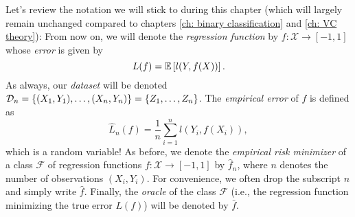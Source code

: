 Let's review the notation we will stick to during this chapter (which will largely remain unchanged compared to chapters \ref{ch: binary classification} and \ref{ch: VC theory}): From now on, we will denote the \emph{regression function} by $f \colon \mathcal{X} \to [-1, 1]$ whose \emph{error} is given by
\[
    L(f) = \mathbb{E}\left[l(Y, f(X))\right].
\]
As always, our \emph{dataset} will be denoted $\mathcal{D}_n = \left\{(X_1, Y_1), \dots, (X_n, Y_n)\right\} = \left\{Z_1, \dots, Z_n\right\}$. The \emph{empirical error} of $f$ is defined as
\[
    \hat L_n(f) = \frac{1}{n} \sum_{i=1}^n l(Y_i, f(X_i)),
\]
which is a random variable! As before, we denote the \emph{empirical risk minimizer} of a class $\mathcal{F}$ of regression functions $f \colon \mathcal{X} \to [-1, 1]$ by $\hat f_n$, where $n$ denotes the number of observations $(X_i, Y_i)$. For convenience, we often drop the subscript $n$ and simply write $\hat f$. Finally, the \emph{oracle} of the class $\mathcal{F}$ (i.e., the regression function minimizing the true error $L(f)$) will be denoted by $\bar f$.
